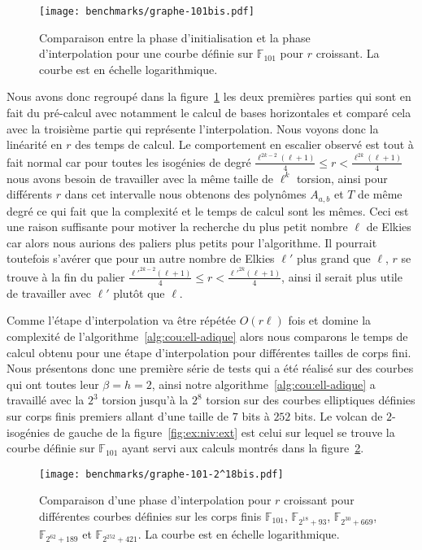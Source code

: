\documentclass[10pt,a4paper]{book}
\theoremstyle{plain}
\theoremstyle{definition}
\theoremstyle{definition}
\theoremstyle{definition}
\theoremstyle{definition}
\theoremstyle{definition}
\theoremstyle{remark}
\theoremstyle{remark}
\theoremstyle{definition}
\begin{document}
\begin{figure}
\texttt{[image: benchmarks/graphe-101bis.pdf]} 
\caption{\label{fig:exp:uni} Comparaison entre la phase d'initialisation et la phase d'interpolation pour une courbe définie sur $\mathbb{F}_{101}$ pour $r$ croissant. La courbe est en échelle logarithmique.}
\end{figure}


Nous avons donc regroupé dans la figure~\ref{fig:exp:uni} les deux premières 
parties qui sont en fait du pré-calcul avec notamment le calcul de bases 
horizontales et comparé cela avec la troisième partie qui représente 
l'interpolation. Nous voyons donc la linéarité en $r$ des temps de calcul. 
Le comportement en escalier observé est tout à fait normal car pour toutes les 
isogénies de degré $\frac{\ell^{2k-2}(\ell+1)}{4} \leqslant r < 
\frac{\ell^{2k}(\ell+1)}{4}$ nous avons besoin de travailler avec la même 
taille de $\ell^{k}$ torsion, ainsi pour différents $r$ dans cet intervalle 
nous obtenons des polynômes $A_{a,b}$ et $T$ de même degré ce qui fait que la 
complexité et le temps de calcul sont les mêmes. 
Ceci est une raison suffisante pour motiver la recherche du plus petit nombre 
$\ell$ de Elkies car alors nous aurions des paliers plus petits pour 
l'algorithme. Il pourrait toutefois s'avérer que pour un autre nombre de Elkies
$\ell'$ plus grand que $\ell$, $r$ se trouve à la fin du palier 
$\frac{\ell'^{2k-2}(\ell+1)}{4} \leqslant r < \frac{\ell'^{2k}(\ell+1)}{4}$, 
ainsi il serait plus utile de travailler avec $\ell'$ plutôt que $\ell$.

Comme l'étape d'interpolation va être répétée $O(r \ell)$ fois et domine la 
complexité de l'algorithme~\ref{alg:cou:ell-adique} alors nous comparons le temps 
de calcul obtenu pour une étape d'interpolation pour différentes tailles de 
corps fini.
Nous présentons donc une première série de tests qui a été réalisé sur des 
courbes qui ont toutes leur $\beta=h=2$, ainsi notre 
algorithme~\ref{alg:cou:ell-adique} a travaillé avec la $2^3$ torsion jusqu'à la 
$2^8$ torsion sur des courbes elliptiques définies sur corps finis premiers 
allant d'une taille de $7$ bits à $252$ bits. Le volcan de $2$-isogénies de 
gauche de la figure~\ref{fig:ex:niv:ext} est celui sur lequel se trouve la 
courbe définie sur $\mathbb{F}_{101}$ ayant servi aux calculs montrés dans la 
figure~\ref{fig:exp:dif}.

\begin{figure}
\begin{center}
%
\texttt{[image: benchmarks/graphe-101-2^18bis.pdf]} 
%
\caption{\label{fig:exp:dif} Comparaison d'une phase d'interpolation pour $r$ croissant pour différentes courbes définies sur les corps finis $\mathbb{F}_{101}$, $\mathbb{F}_{2^{18}+93 }$, $\mathbb{F}_{2^{30}+669}$, $\mathbb{F}_{2^{62}+189}$ et $\mathbb{F}_{2^{252}+421}$. La courbe est en échelle logarithmique.}
\end{center}
\end{figure}
\end{document}
